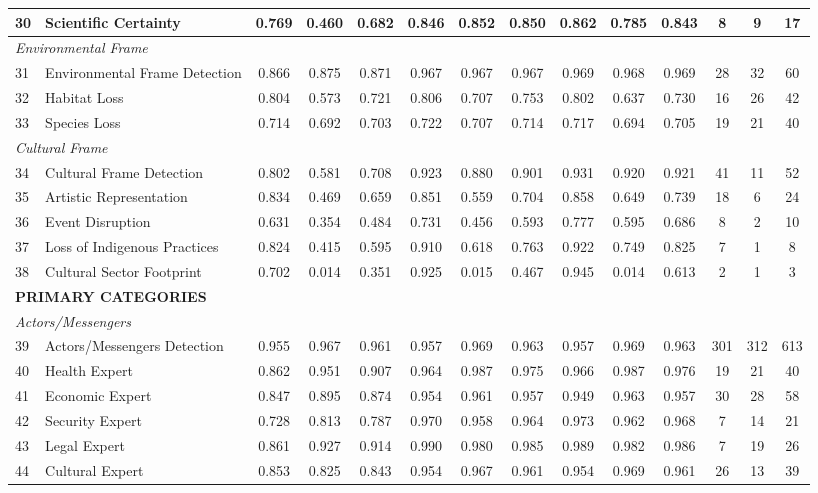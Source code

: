\documentclass[12pt]{article}
\begin{document}
{\begin{longtable}{p{0.4cm}p{5.5cm}cccccccccccc}
30 & Scientific Certainty & 0.769 & 0.460 & 0.682 & 0.846 & 0.852 & 0.850 & 0.862 & 0.785 & 0.843 & 8 & 9 & 17 \\
\midrule
\multicolumn{14}{l}{\textit{Environmental Frame}} \\
31 & Environmental Frame Detection & 0.866 & 0.875 & 0.871 & 0.967 & 0.967 & 0.967 & 0.969 & 0.968 & 0.969 & 28 & 32 & 60 \\
32 & Habitat Loss & 0.804 & 0.573 & 0.721 & 0.806 & 0.707 & 0.753 & 0.802 & 0.637 & 0.730 & 16 & 26 & 42 \\
33 & Species Loss & 0.714 & 0.692 & 0.703 & 0.722 & 0.707 & 0.714 & 0.717 & 0.694 & 0.705 & 19 & 21 & 40 \\
\midrule
\multicolumn{14}{l}{\textit{Cultural Frame}} \\
34 & Cultural Frame Detection & 0.802 & 0.581 & 0.708 & 0.923 & 0.880 & 0.901 & 0.931 & 0.920 & 0.921 & 41 & 11 & 52 \\
35 & Artistic Representation & 0.834 & 0.469 & 0.659 & 0.851 & 0.559 & 0.704 & 0.858 & 0.649 & 0.739 & 18 & 6 & 24 \\
36 & Event Disruption & 0.631 & 0.354 & 0.484 & 0.731 & 0.456 & 0.593 & 0.777 & 0.595 & 0.686 & 8 & 2 & 10 \\
37 & Loss of Indigenous Practices & 0.824 & 0.415 & 0.595 & 0.910 & 0.618 & 0.763 & 0.922 & 0.749 & 0.825 & 7 & 1 & 8 \\
38 & Cultural Sector Footprint & 0.702 & 0.014 & 0.351 & 0.925 & 0.015 & 0.467 & 0.945 & 0.014 & 0.613 & 2 & 1 & 3 \\
\midrule
\multicolumn{14}{l}{\cellcolor{gray!10}\textbf{PRIMARY CATEGORIES}} \\
\midrule
\multicolumn{14}{l}{\textit{Actors/Messengers}} \\
39 & Actors/Messengers Detection & 0.955 & 0.967 & 0.961 & 0.957 & 0.969 & 0.963 & 0.957 & 0.969 & 0.963 & 301 & 312 & 613 \\
40 & Health Expert & 0.862 & 0.951 & 0.907 & 0.964 & 0.987 & 0.975 & 0.966 & 0.987 & 0.976 & 19 & 21 & 40 \\
41 & Economic Expert & 0.847 & 0.895 & 0.874 & 0.954 & 0.961 & 0.957 & 0.949 & 0.963 & 0.957 & 30 & 28 & 58 \\
42 & Security Expert & 0.728 & 0.813 & 0.787 & 0.970 & 0.958 & 0.964 & 0.973 & 0.962 & 0.968 & 7 & 14 & 21 \\
43 & Legal Expert & 0.861 & 0.927 & 0.914 & 0.990 & 0.980 & 0.985 & 0.989 & 0.982 & 0.986 & 7 & 19 & 26 \\
44 & Cultural Expert & 0.853 & 0.825 & 0.843 & 0.954 & 0.967 & 0.961 & 0.954 & 0.969 & 0.961 & 26 & 13 & 39 \\

\end{longtable}}
\end{document}
